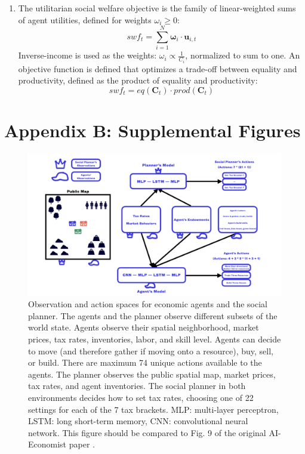 \documentclass{article}
\begin{document}
\begin{enumerate}
	\item The utilitarian social welfare objective is the family of linear-weighted sums of agent utilities, defined for weights \( \omega_{i} \geq 0 \):
	\begin{equation}\label{Equation12}
		swf_{t} = \sum^{N}_{i = 1} \mathbf{\omega}_{i} \cdot \mathbf{u}_{i, t}
	\end{equation}
	Inverse-income is used as the weights: \( \omega_{i} \propto \frac{1}{C_{i}} \), normalized to sum to one. An objective function is defined that optimizes a trade-off between equality and productivity, defined as the product of equality and productivity:
	\begin{equation}\label{Equation13}
		swf_{t} = eq(\mathbf{C}_{t}) \cdot prod(\mathbf{C}_{t})
	\end{equation}
\end{enumerate}

\newpage

\section{Appendix B: Supplemental Figures}

\begin{figure}[h!]
	\centering
	\includegraphics[width=0.7\linewidth]{"A_Multi-agent_Reinforcement_Learning_Study_of_Emergence_of_Social_Classes_out_of_Arbitrary_Governance_The_Role_of_Environment_Slides_1/A_Multi-agent_Reinforcement_Learning_Study_of_Emergence_of_Social_Classes_out_of_Arbitrary_Governance_The_Role_of_Environment_Slides_1.002"}
	\caption{Observation and action spaces for economic agents and the social planner. The agents and the planner observe different subsets of the world state. Agents observe their spatial neighborhood, market prices, tax rates, inventories, labor, and skill level. Agents can decide to move (and therefore gather if moving onto a resource), buy, sell, or build. There are maximum 74 unique actions available to the agents. The planner observes the public spatial map, market prices, tax rates, and agent inventories. The social planner in both environments decides how to set tax rates, choosing one of 22 settings for each of the 7 tax brackets. MLP: multi-layer perceptron, LSTM: long short-term memory, CNN: convolutional neural network. This figure should be compared to Fig. 9 of the original AI-Economist paper \citep{Zheng2022}.}
	\label{Figure7}
\end{figure}
\end{document}
